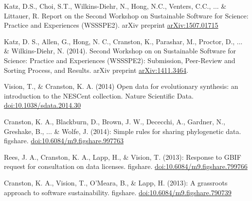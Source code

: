 \documentclass[10pt]{article}
\begin{document}
Katz, D.S., Choi, S.T., Wilkins-Diehr, N., Hong, N.C., Venters, C.C., ... \& Littauer, R. Report on the Second Workshop on Sustainable Software for Science: Practice and Experiences (WSSSPE2). arXiv preprint \href{http://arxiv.org/abs/1507.01715}{arXiv:1507.01715}

Katz, D. S., Allen, G., Hong, N. C., Cranston, K., Parashar, M., Proctor, D., ... \& Wilkins-Diehr, N. (2014). Second Workshop on on Sustainable Software for Science: Practice and Experiences (WSSSPE2): Submission, Peer-Review and Sorting Process, and Results. arXiv preprint \href{http://arxiv.org/abs/1411.3464}{arXiv:1411.3464}.

Vision, T., \& Cranston, K. A. (2014) Open data for evolutionary synthesis: an introduction to the NESCent collection. Nature Scientific Data. \href{http://dx.doi.org/10.1038/sdata.2014.30}{doi:10.1038/sdata.2014.30}

Cranston, K. A., Blackburn, D., Brown, J. W., Dececchi, A., Gardner, N., Greshake, B., ... \& Wolfe, J. (2014): Simple rules for sharing phylogenetic data. figshare. \href{http://dx.doi.org/10.6084/m9.figshare.997763}{doi:10.6084/m9.figshare.997763}

Rees, J. A., Cranston, K. A., Lapp, H., \& Vision, T. (2013): Response to GBIF request for consultation on data licenses. figshare. \href{http://dx.doi.org/10.6084/m9.figshare.799766}{doi:10.6084/m9.figshare.799766}

Cranston, K. A., Vision, T., O'Meara, B., \& Lapp, H. (2013): A grassroots approach to software sustainability. figshare.
\href{http://dx.doi.org/10.6084/m9.figshare.790739}{doi:10.6084/m9.figshare.790739}

\end{document}

